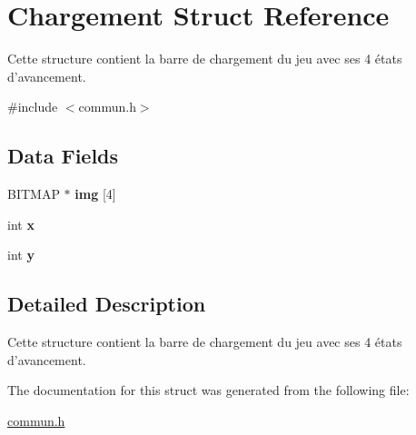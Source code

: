 \hypertarget{struct_chargement}{\section{Chargement Struct Reference}
\label{struct_chargement}
}


Cette structure contient la barre de chargement du jeu avec ses 4 états d'avancement.  




{\ttfamily \#include $<$commun.\-h$>$}

\subsection*{Data Fields}
\begin{DoxyCompactItemize}
\item 
\hypertarget{struct_chargement_acc64649e1a4857389f509f6d06b93732}{B\-I\-T\-M\-A\-P $\ast$ {\bfseries img} \mbox{[}4\mbox{]}}\label{struct_chargement_acc64649e1a4857389f509f6d06b93732}

\item 
\hypertarget{struct_chargement_a6150e0515f7202e2fb518f7206ed97dc}{int {\bfseries x}}\label{struct_chargement_a6150e0515f7202e2fb518f7206ed97dc}

\item 
\hypertarget{struct_chargement_a0a2f84ed7838f07779ae24c5a9086d33}{int {\bfseries y}}\label{struct_chargement_a0a2f84ed7838f07779ae24c5a9086d33}

\end{DoxyCompactItemize}


\subsection{Detailed Description}
Cette structure contient la barre de chargement du jeu avec ses 4 états d'avancement. 


\begin{DoxyItemize}
\item 
\end{DoxyItemize}

The documentation for this struct was generated from the following file\-:\begin{DoxyCompactItemize}
\item 
\hyperlink{commun_8h}{commun.\-h}\end{DoxyCompactItemize}
